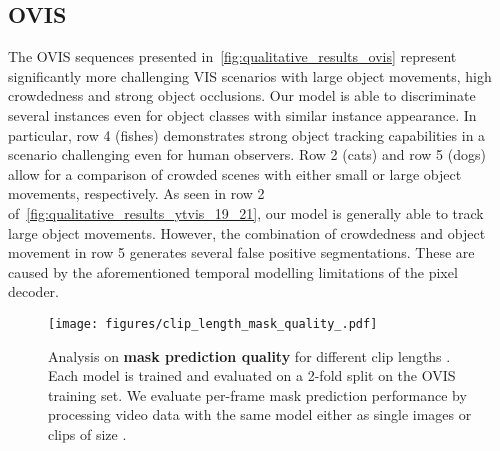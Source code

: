 \documentclass{article}
\newcommand{\method}{\mbox{NOVIS}}
\theoremstyle{plain}
\theoremstyle{definition}
\theoremstyle{remark}
\begin{document}
\subsection{OVIS}
The OVIS sequences presented in~\cref{fig:qualitative_results_ovis} represent significantly more challenging VIS scenarios with large object movements, high crowdedness and strong object occlusions.
Our model is able to discriminate several instances even for object classes with similar instance appearance.
In particular, row 4 (fishes) demonstrates strong object tracking capabilities in a scenario challenging even for human observers.
Row 2 (cats) and row 5 (dogs) allow for a comparison of crowded scenes with either small or large object movements, respectively.
As seen in row 2 of~\cref{fig:qualitative_results_ytvis_19_21}, our model is generally able to track large object movements.
However, the combination of crowdedness and object movement in row 5 generates several false positive segmentations.
These are caused by the aforementioned temporal modelling limitations of the pixel decoder.



\begin{table}
    \centering
    \caption{
Summary of \textbf{~\method{} hyperparameters} for several VIS benchmarks.
In contrast to~\cite{cheng2021mask2former}, we drop the learning rate (LR) twice.
The OVIS~\cite{ovis} benchmark contains sequences with more than 20 objects, hence we increase the number of top-k predictions at test-time.
    }
    \label{tab:hyperparams_benchmarks}
\end{table} \begin{figure}
    \centering
    \texttt{[image: figures/clip\_length\_mask\_quality\_.pdf]}
    \caption{
        Analysis on \textbf{mask prediction quality} for different clip lengths .
Each model is trained and evaluated on a 2-fold split on the OVIS~\cite{ovis} training set.
We evaluate per-frame mask prediction performance by processing video data with the same model either as single images or clips of size .}
    \label{fig:clip_length_mask_quality}
\end{figure} 
\end{document}
